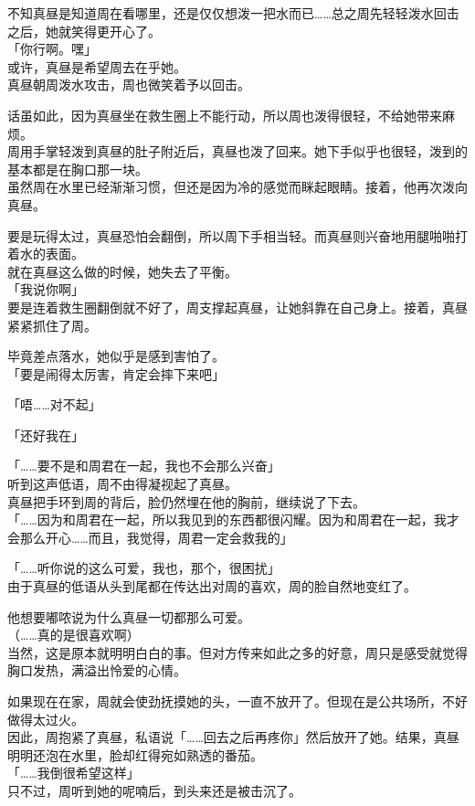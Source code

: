 不知真昼是知道周在看哪里，还是仅仅想泼一把水而已……总之周先轻轻泼水回击之后，她就笑得更开心了。\\

「你行啊。嘿」\\

或许，真昼是希望周去在乎她。\\

真昼朝周泼水攻击，周也微笑着予以回击。

话虽如此，因为真昼坐在救生圈上不能行动，所以周也泼得很轻，不给她带来麻烦。\\

周用手掌轻泼到真昼的肚子附近后，真昼也泼了回来。她下手似乎也很轻，泼到的基本都是在胸口那一块。\\

虽然周在水里已经渐渐习惯，但还是因为冷的感觉而眯起眼睛。接着，他再次泼向真昼。

要是玩得太过，真昼恐怕会翻倒，所以周下手相当轻。而真昼则兴奋地用腿啪啪打着水的表面。\\

就在真昼这么做的时候，她失去了平衡。\\

「我说你啊」\\

要是连着救生圈翻倒就不好了，周支撑起真昼，让她斜靠在自己身上。接着，真昼紧紧抓住了周。

毕竟差点落水，她似乎是感到害怕了。\\

「要是闹得太厉害，肯定会摔下来吧」

「唔……对不起」

「还好我在」

「……要不是和周君在一起，我也不会那么兴奋」\\

听到这声低语，周不由得凝视起了真昼。\\

真昼把手环到周的背后，脸仍然埋在他的胸前，继续说了下去。\\

「……因为和周君在一起，所以我见到的东西都很闪耀。因为和周君在一起，我才会那么开心……而且，我觉得，周君一定会救我的」

「……听你说的这么可爱，我也，那个，很困扰」\\

由于真昼的低语从头到尾都在传达出对周的喜欢，周的脸自然地变红了。

他想要嘟哝说为什么真昼一切都那么可爱。\\

（……真的是很喜欢啊）\\

当然，这是原本就明明白白的事。但对方传来如此之多的好意，周只是感受就觉得胸口发热，满溢出怜爱的心情。

如果现在在家，周就会使劲抚摸她的头，一直不放开了。但现在是公共场所，不好做得太过火。\\

因此，周抱紧了真昼，私语说「……回去之后再疼你」然后放开了她。结果，真昼明明还泡在水里，脸却红得宛如熟透的番茄。\\

「……我倒很希望这样」\\

只不过，周听到她的呢喃后，到头来还是被击沉了。
